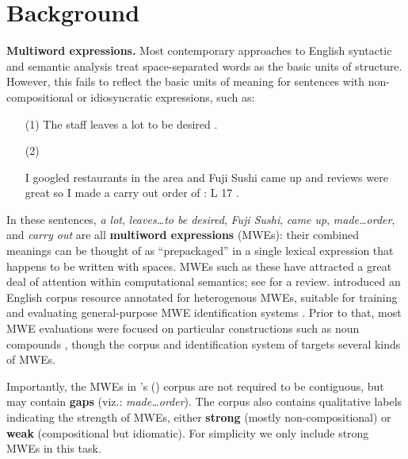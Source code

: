 \documentclass[11pt,letterpaper]{article}
\newcommand{\citeposs}[1]{\citeauthor{#1}'s (\citeyear{#1})}
\newcommand{\lex}[1]{\textit{#1}} %
\begin{document}
\section{Background}\label{sec:integration}
\textbf{Multiword expressions.} 
Most contemporary approaches to English syntactic and semantic analysis
treat space-separated words as the basic units of structure. 
However, this fails to reflect 
the basic units of meaning for sentences with non-compositional or idiosyncratic expressions, such as:
\begin{itemize}[labelindent=2em]
\item[(1)] The staff {\color{red}leaves} {\color{blue}a lot} {\color{red}to be desired} .
\item[(2)] \raggedright I googled restaurants in the area and {\color{red}Fuji Sushi} {\color{blue}came up} and reviews were great so I {\color{mdgreen}made a} {\color{orange}carry out} {\color{mdgreen}order} of : L 17 .
\end{itemize}
In these sentences, \lex{a lot}, \lex{leaves\ldots to be desired}, 
\lex{Fuji Sushi}, \lex{came up}, \lex{made\ldots order}, and \lex{carry out}
are all \textbf{multiword expressions} (MWEs): their combined meanings can be thought of as ``prepackaged'' 
in a single lexical expression that happens to be written with spaces.
MWEs such as these have attracted a great deal of attention 
within computational semantics; see \citet{baldwin-10} for a review.
 introduced an English corpus resource annotated for heterogenous MWEs, 
suitable for training and evaluating general-purpose MWE identification systems \citep{schneider-14}.
Prior to that, most MWE evaluations were focused on particular constructions such as noun compounds \citep[recently:][]{constant-11,green-12,ramisch-12,vincze-13},
though the corpus and identification system of \citet{vincze-11} targets several kinds of MWEs.

Importantly, the MWEs in \citeposs{schneider-14-corpus} corpus are not required to be contiguous, 
but may contain \textbf{gaps} (viz.: \lex{made\ldots order}). The corpus also contains qualitative labels indicating the strength of MWEs, either \textbf{strong} (mostly non-compositional) or \textbf{weak} (compositional but idiomatic). For simplicity we only include strong MWEs in this task.
\end{document}
